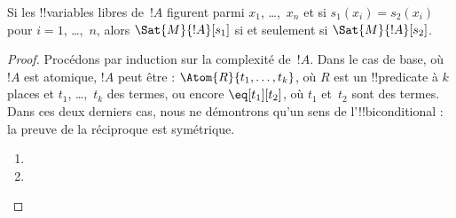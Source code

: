 \documentclass[../../../include/open-logic-section]{subfiles}
\begin{document}
\begin{prop}
Si les !!{variable}s libres de~$!A$ figurent parmi
$x_1$, \dots,~$x_n$ et si $s_1(x_i) = s_2(x_i)$ pour
$i = 1$, \dots,~$n$, alors $\Sat{M}{!A}[s_1]$ si et seulement si
$\Sat{M}{!A}[s_2]$.
\end{prop}

\begin{proof}
Procédons par induction sur la complexité de~$!A$. Dans le cas de
base, où $!A$ est atomique, $!A$ peut être :
$\Atom{R}{t_1, \dots, t_k}$, où $R$ est un !!{predicate} à $k$
places et $t_1$, \dots,~$t_k$ des termes, ou encore
$\eq[t_1][t_2]$, où $t_1$ et~$t_2$ sont des termes. Dans ces deux
derniers cas, nous ne démontrons qu'un sens de l'!!{biconditional} :
la preuve de la réciproque est symétrique.

\begin{enumerate}


\item
\item
\end{enumerate}


\end{proof}
\end{document}
